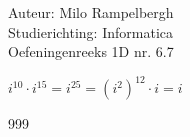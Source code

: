 \documentclass[a4paper]{article}
\begin{document}
\noindent \large Auteur: Milo Rampelbergh \\
\noindent \large Studierichting: Informatica\\
\noindent \large Oefeningenreeks 1D nr. 6.7\\

\medskip

\normalsize


$ i^{10} \cdot i^{15} = i^{25} = (i^2)^{12} \cdot i = i $


\begin{thebibliography}{999}
\end{thebibliography}
\end{document}
